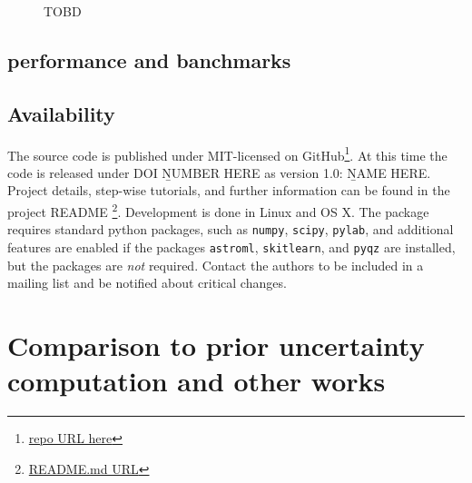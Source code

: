 \documentclass{emulateapj}
\begin{document}
\begin{figure}[!ht]
\caption{TOBD}
 \label{cd}
\end{figure}

\subsection{performance and banchmarks}

\subsection{Availability}
The source code is published under MIT-licensed on GitHub\footnote{\url{repo URL here}}. At this time the code is released under DOI {\b NUMBER HERE} as version 1.0: {\b NAME HERE}. Project
details, step-wise tutorials, and further information can be found in the project README \footnote{\url{README.md URL}}.
Development is done in Linux and OS X. The package requires standard python packages, such as \verb=numpy=, \verb=scipy=, \verb=pylab=, and additional features are enabled if the packages \verb=astroml=, \verb=skitlearn=, and \verb=pyqz= are installed, but the packages are \emph{not} required. Contact the authors to be included in a mailing list and be notified about critical changes. 




\section{Comparison to prior uncertainty computation and other works }\label{comp_sec}
\end{document}
